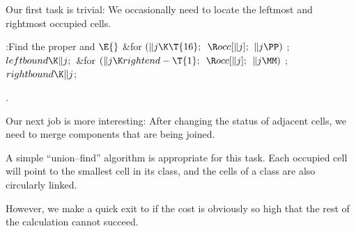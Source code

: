 Our first task is trivial: We occasionally need to locate the leftmost and
rightmost occupied cells.

\Y\B\4:Find the proper  and \X${}\E{}$%
\6
\&{for} ${}(\|j\K\T{16};{}$ ${}\R\\{occ}[\|j];{}$ ${}\|j\PP){}$\1\5
;\2\6
${}\\{leftbound}\K\|j;{}$\6
\&{for} ${}(\|j\K\\{rightend}-\T{1};{}$ ${}\R\\{occ}[\|j];{}$ ${}\|j\MM){}$\1\5
;\2\6
${}\\{rightbound}\K\|j{}$;\par
{}.\fi

Our next job is more interesting: After changing the
status of
adjacent cells, we need to merge components that are being joined.

A simple ``union--find'' algorithm is appropriate for this task.
Each occupied cell will point to the smallest cell in its class,
and the cells of a class are also circularly linked.

However, we make a quick exit to  if the cost is obviously so high
that the rest of the calculation cannot succeed.

